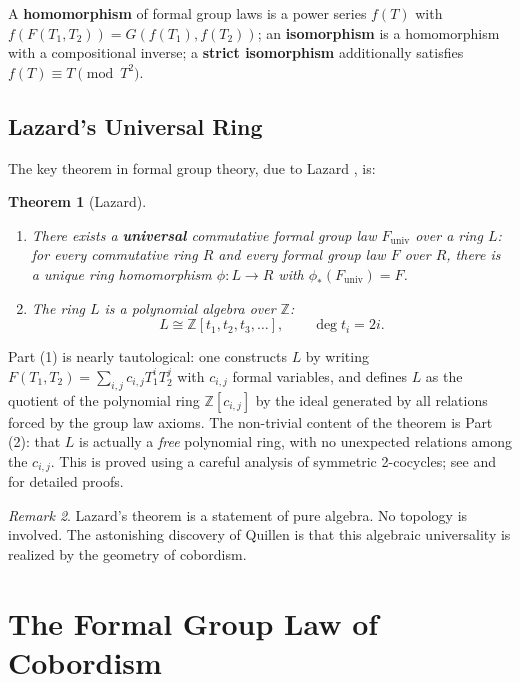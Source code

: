 \documentclass[12pt]{article}
\newtheorem{theorem}{Theorem}[section]
\theoremstyle{definition}
\theoremstyle{remark}
\newtheorem{remark}[theorem]{Remark}
\newcommand{\Z}{\mathbb{Z}}
\begin{document}
A \textbf{homomorphism} of formal group laws is a power series $f(T)$ with $f(F(T_1, T_2)) = G(f(T_1), f(T_2))$; an \textbf{isomorphism} is a homomorphism with a compositional inverse; a \textbf{strict isomorphism} additionally satisfies $f(T) \equiv T \pmod{T^2}$.

\subsection{Lazard's Universal Ring}

The key theorem in formal group theory, due to Lazard \cite{Laz55}, is:

\begin{theorem}[Lazard]\label{thm:lazard}
\begin{enumerate}
  \item There exists a \textbf{universal} commutative formal group law $F_{\mathrm{univ}}$ over a ring $L$: for every commutative ring $R$ and every formal group law $F$ over $R$, there is a unique ring homomorphism $\phi : L \to R$ with $\phi_*(F_{\mathrm{univ}}) = F$.
  \item The ring $L$ is a polynomial algebra over $\Z$:
  \[
    L \cong \Z[t_1, t_2, t_3, \ldots], \qquad \deg t_i = 2i.
  \]
\end{enumerate}
\end{theorem}

Part (1) is nearly tautological: one constructs $L$ by writing $F(T_1, T_2) = \sum_{i,j} c_{i,j} T_1^i T_2^j$ with $c_{i,j}$ formal variables, and defines $L$ as the quotient of the polynomial ring $\Z[c_{i,j}]$ by the ideal generated by all relations forced by the group law axioms. The non-trivial content of the theorem is Part (2): that $L$ is actually a \emph{free} polynomial ring, with no unexpected relations among the $c_{i,j}$. This is proved using a careful analysis of symmetric 2-cocycles; see \cite{WL25} and \cite[Appendix~2]{Rav86} for detailed proofs.

\begin{remark}
Lazard's theorem is a statement of pure algebra. No topology is involved. The astonishing discovery of Quillen is that this algebraic universality is realized by the geometry of cobordism.
\end{remark}

\section{The Formal Group Law of Cobordism}\label{sec:bridge}
\end{document}
